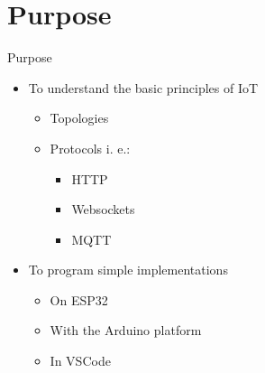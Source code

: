 \documentclass[aspectratio=169]{beamer}
\begin{document}
\section{Purpose}
\begin{frame}{Purpose}
	\begin{textBox}
		\begin{itemize}
			\item To understand the basic principles of IoT
			\begin{itemize}
				\item Topologies
				\item Protocols i. e.:
				\begin{itemize}
					\item HTTP
					\item Websockets
					\item MQTT
				\end{itemize}
			\end{itemize}
			\item To program simple implementations
			\begin{itemize}
				\item On ESP32
				\item With the Arduino platform
				\item In VSCode
			\end{itemize}
		\end{itemize}
	\end{textBox}
\end{frame}
\end{document}
